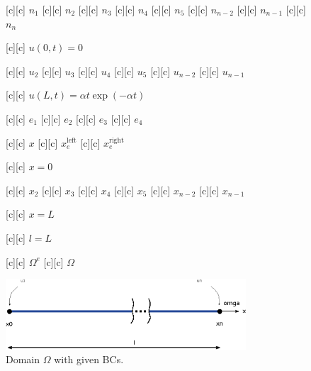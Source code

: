 \begin{figure}[ht]
	\centering
	\footnotesize

	[c] {$n_1$}
	[c] {$n_2$}
	[c] {$n_3$}
	[c] {$n_4$}
	[c] {$n_5$}
	[c] {$n_{n-2}$}
	[c] {$n_{n-1}$}
	[c] {$n_{n}$}


	[c] {$u(0,t)=0$}

	[c] {$u_2$}
	[c] {$u_3$}
	[c] {$u_4$}
	[c] {$u_5$}
	[c] {$u_{n-2}$}
	[c] {$u_{n-1}$}

	[c] {$u(L,t) = \alpha t\exp(-\alpha t)$}

	[c] {$e_1$}
	[c] {$e_2$}
	[c] {$e_3$}
	[c] {$e_4$}

	[c] {$x$}
	[c] {$x_{e}^{\text{left}}$}
	[c] {$x_{e}^{\text{right}}$}

	[c] {$x=0$}

	[c] {$x_2$}
	[c] {$x_3$}
	[c] {$x_4$}
	[c] {$x_5$}
	[c] {$x_{n-2}$}
	[c] {$x_{n-1}$}

	[c] {$x=L$}

	[c] {$l=L$}


	[c] {$\Omega^{e}$}
	[c] {$\Omega$}

	\includegraphics[width=0.8\textwidth]{nodiscretize.eps}

	\caption{Domain $\Omega$ with given BCs.}
	\label{\LABEL}
\end{figure}


